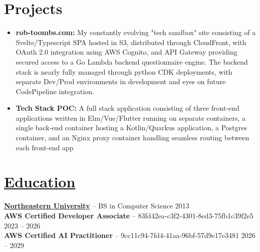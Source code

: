\documentclass[10pt,letterpaper]{article}
\begin{document}
\vspace{-18.5pt}


 \section*{Projects}
 \begin{itemize}
    \item \textbf{rob-toombs.com:} My constantly evolving "tech sandbox" site consisting of a Svelte/Typescript SPA hosted in S3, distributed through CloudFront, with OAuth 2.0 integration using AWS Cognito, and API Gateway providing secured access to a Go Lambda backend questionnaire engine. The backend stack is nearly fully managed through python CDK deployments, with separate Dev/Prod environments in development and eyes on future CodePipeline integration.
   \item \textbf{Tech Stack POC:} A full stack application consisting of three front-end applications written in Elm/Vue/Flutter running on separate containers, a single back-end container hosting a Kotlin/Quarkus application, a Postgres container, and an Nginx proxy container handling seamless routing between each front-end app
 \end{itemize}

\vspace{-18.5pt}


\section*{\href{https://www.reddit.com/r/EngineeringResumes/wiki/index\#wiki_education}{Education}}
\textbf{\href{https://www.northeastern.edu/}{Northeastern University}} -- BS in Computer Science \hfill 2013 \\
\textbf{AWS Certified Developer Associate} -- 83fd42ea-c3f2-4301-8ed3-75fb1c39f2e5 \hfill 2023 -- 2026 \\
\textbf{AWS Certified AI Practitioner} -- 9cc11c94-7fd4-41aa-96bf-57d9e17e3481 \hfill 2026 -- 2029

\end{document}
